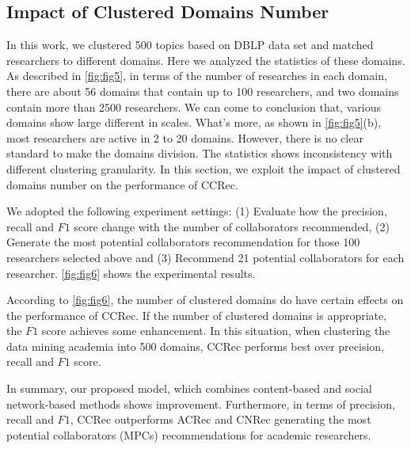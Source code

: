 \subsection*{Impact of Clustered Domains Number}
In this work, we clustered 500 topics based on DBLP data set and matched researchers to different domains. Here we analyzed the statistics of these domains. As described in \autoref{fig:fig5}, in terms of the number of researches in each domain, there are about 56 domains that contain up to 100 researchers, and two domains contain more than 2500 researchers. We can come to conclusion that, various domains show large different in scales. What's more, as shown in \autoref{fig:fig5}(b), most researchers are active in 2 to 20 domains. However, there is no clear standard to make the domains division. The statistics shows inconsistency with different clustering granularity. In this section, we exploit the impact of clustered domains number on the performance of CCRec.

We adopted the following experiment settings: (1) Evaluate how the precision, recall and $F1$ score change with the number of collaborators recommended, (2) Generate the most potential collaborators recommendation for those 100 researchers selected above and (3) Recommend 21 potential collaborators for each researcher. \autoref{fig:fig6} shows the experimental results.


According to \autoref{fig:fig6}, the number of clustered domains do have certain effects on the performance of CCRec. If the number of clustered domains is appropriate, the $F1$ score achieves some enhancement. In this situation, when clustering the data mining academia into 500 domains, CCRec performs best over precision, recall and $F1$ score.

In summary, our proposed model, which combines content-based and social network-based methods shows improvement. Furthermore, in terms of precision, recall and $F1$, CCRec outperforms ACRec and CNRec generating the most potential collaborators (MPCs) recommendations for academic researchers.

